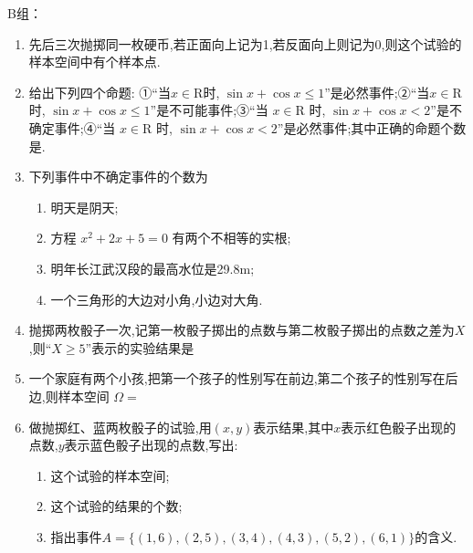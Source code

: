 B组：
\begin{enumerate}

\item 先后三次抛掷同一枚硬币,若正面向上记为1,若反面向上则记为0,则这个试验的样本空间中有个样本点.

\item 给出下列四个命题: 
①“当$x\in\text{R}$时, $\sin x+\cos x\le1$”是必然事件;②“当$x\in\text{R}$时, $\sin x+\cos x\le1$”是不可能事件;③“当 $x\in\text{R}$ 时, $\sin x+\cos x<2$”是不确定事件;④“当 $x\in\text{R}$ 时, $\sin x+\cos x<2$”是必然事件;其中正确的命题个数是.

\item 下列事件中不确定事件的个数为
\begin{enumerate}
    \item 明天是阴天;
    \item 方程 $x^{2}+2x+5=0$ 有两个不相等的实根;
    \item 明年长江武汉段的最高水位是29.8m; 
    \item 一个三角形的大边对小角,小边对大角.
\end{enumerate}

\item 抛掷两枚骰子一次,记第一枚骰子掷出的点数与第二枚骰子掷出的点数之差为$X$,则“$X\ge5$”表示的实验结果是

\item 一个家庭有两个小孩,把第一个孩子的性别写在前边,第二个孩子的性别写在后边,则样本空间 $\Omega=$

\item 做抛掷红、蓝两枚骰子的试验,用$(x,y)$表示结果,其中$x$表示红色骰子出现的点数,$y$表示蓝色骰子出现的点数,写出:
\begin{enumerate}
\item 这个试验的样本空间;
\item 这个试验的结果的个数;
\item 指出事件$A=\{(1, 6), (2, 5), (3, 4), (4, 3), (5,2), (6,1)\}$的含义.
\end{enumerate}


\end{enumerate}
